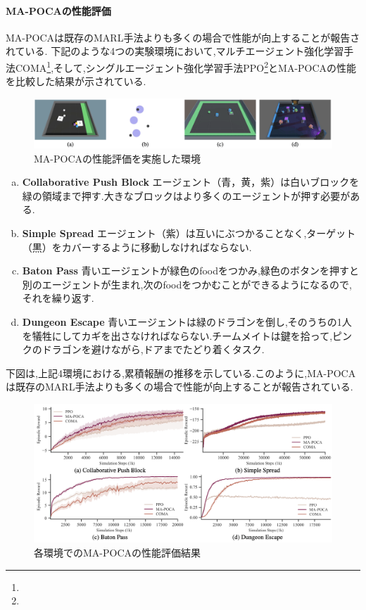   \paragraph{MA-POCAの性能評価}
  MA-POCAは既存のMARL手法よりも多くの場合で性能が向上することが報告されている\cite{mapoca}.
  下記のような4つの実験環境において,マルチエージェント強化学習手法COMA\footnote{},そして,シングルエージェント強化学習手法PPO\footnote{}とMA-POCAの性能を比較した結果が示されている.
  \begin{figure}[H] 
    \centering 
    \includegraphics[width=1.0\textwidth]{Figures/2022-10-06_10.03.52.png}
    \caption{MA-POCAの性能評価を実施した環境} 
    \label{fig:01} 
  \end{figure}
  \begin{enumerate}[(a)]
    \item \textbf{Collaborative Push Block}
    エージェント（青，黄，紫）は白いブロックを緑の領域まで押す.大きなブロックはより多くのエージェントが押す必要がある.
  
    \item \textbf{Simple Spread}
    エージェント（紫）は互いにぶつかることなく,ターゲット（黒）をカバーするように移動しなければならない.
    
    \item \textbf{Baton Pass}
    青いエージェントが緑色のfoodをつかみ,緑色のボタンを押すと別のエージェントが生まれ,次のfoodをつかむことができるようになるので,それを繰り返す.
    
    \item \textbf{Dungeon Escape}
    青いエージェントは緑のドラゴンを倒し,そのうちの1人を犠牲にしてカギを出さなければならない.チームメイトは鍵を拾って,ピンクのドラゴンを避けながら,ドアまでたどり着くタスク.
\end{enumerate}
下図は,上記4環境における,累積報酬の推移を示している.このように,MA-POCAは既存のMARL手法よりも多くの場合で性能が向上することが報告されている.
\begin{figure}[H] 
  \centering 
  \includegraphics[width=1.0\textwidth]{Figures/2022-10-06_10.04.14-min.png}
  \caption{各環境でのMA-POCAの性能評価結果} 
  \label{fig:01} 
\end{figure}

